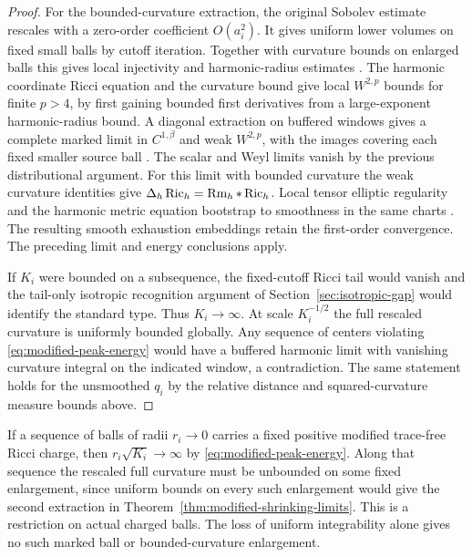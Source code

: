 \begin{proof}
For the bounded-curvature extraction, the original Sobolev
estimate rescales with a zero-order coefficient \(O(a_i^2)\).
It gives uniform lower volumes on fixed small balls by cutoff
iteration. Together with curvature bounds on enlarged balls
this gives local injectivity and harmonic-radius estimates
\cite[Theorem~4.7]{CheegerGromovTaylor1982}%
\cite[Theorem~0.3]{AndersonCheeger1992Harmonic}.
The harmonic coordinate Ricci equation and the curvature bound
give local \(W^{2,p}\) bounds for finite \(p>4\), by first gaining
bounded first derivatives from a large-exponent harmonic-radius
bound. A diagonal extraction on buffered windows gives a
complete marked limit in \(C^{1,\beta}\) and weak \(W^{2,p}\),
with the images covering each fixed smaller source ball
\cite[Theorem~3.1 and proof]{BelegradekKapovitch2000Finiteness}.
The scalar and Weyl limits vanish by the previous distributional
argument. For this limit with bounded curvature the weak
curvature identities give \(\Delta_h\operatorname{Ric}_h=\operatorname{Rm}_h*\operatorname{Ric}_h\).
Local tensor elliptic regularity and the harmonic metric equation
bootstrap to smoothness in the same charts
\cite[Lemma~5.1 and local form of Theorem~2.2(ii)]{AvalosCogoRoyoAbrego2026Bach}.
The resulting smooth exhaustion embeddings retain the first-order
convergence. The preceding limit and energy conclusions apply.

If \(K_i\) were bounded on a subsequence, the fixed-cutoff
Ricci tail would vanish and the tail-only isotropic recognition
argument of Section~\ref{sec:isotropic-gap} would identify the
standard type. Thus \(K_i\to\infty\). At scale \(K_i^{-1/2}\)
the full rescaled curvature is uniformly bounded globally.
Any sequence of centers violating \eqref{eq:modified-peak-energy}
would have a buffered harmonic limit with vanishing curvature
integral on the indicated window, a contradiction. The same
statement holds for the unsmoothed \(q_i\) by the relative
distance and squared-curvature measure bounds above.
\end{proof}

If a sequence of balls of radii \(r_i\to0\) carries a fixed
positive modified trace-free Ricci charge, then
\(r_i\sqrt{K_i}\to\infty\) by \eqref{eq:modified-peak-energy}.
Along that sequence the rescaled full curvature must be unbounded
on some fixed enlargement, since uniform bounds on every such
enlargement would give the second extraction in
Theorem~\ref{thm:modified-shrinking-limits}. This is a restriction
on actual charged balls. The loss of uniform integrability alone
gives no such marked ball or bounded-curvature enlargement.
